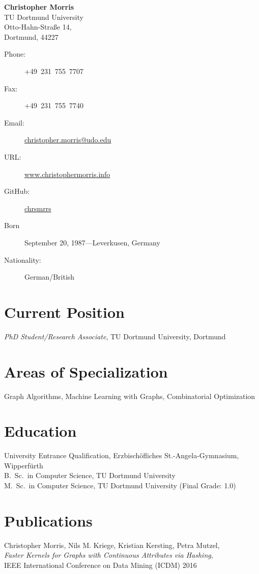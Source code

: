 \documentclass[11pt, a4paper]{scrartcl}
\newcommand{\years}[1]{\marginnote {\bf #1}}
\begin{document}
{\LARGE \bf Christopher Morris}\\[0.5cm] 
TU Dortmund University\\ 
Otto-Hahn-Stra\ss{}e 14,\\
Dortmund, 44227

\begin{description}
	\item[Phone:] 
	+49\ 231~755~7707	
	\item[Fax:] 
	+49~231~755~7740
	\item[Email:] \href{mailto:christopher.morris@udo.edu}{christopher.morris@udo.edu}
	\item[URL:] \href{www.christophermorris.info}{www.christophermorris.info}
	\item[GitHub:] \href{https://github.com/chrsmrrs}{chrsmrrs}
	\item[]\vspace{-0.5em}
	\item[Born] 
	September 20, 1987---Leverkusen, Germany
	\item[Nationality:] 
	German/British 
\end{description}

\section*{Current Position}
\emph{PhD Student/Research Associate}, TU Dortmund University, Dortmund

\section*{Areas of Specialization}
Graph Algorithms, Machine Learning with Graphs, Combinatorial Optimization

\section*{Education}
\years{2007} University Entrance Qualification, Erzbisch\"ofliches St.-Angela-Gymnasium, Wipperf\"urth\\
\years{2012} B.~Sc.~in Computer Science, TU Dortmund University\\
\years{2015} M.~Sc.~in Computer Science, TU Dortmund University (Final Grade: 1.0) 

\section*{Publications}

\years{2016} Christopher Morris, Nils M. Kriege, Kristian Kersting, Petra Mutzel,\\
\emph{Faster Kernels for Graphs with Continuous Attributes via Hashing},\\
IEEE International Conference on Data Mining (ICDM) 2016\\
\end{document}

